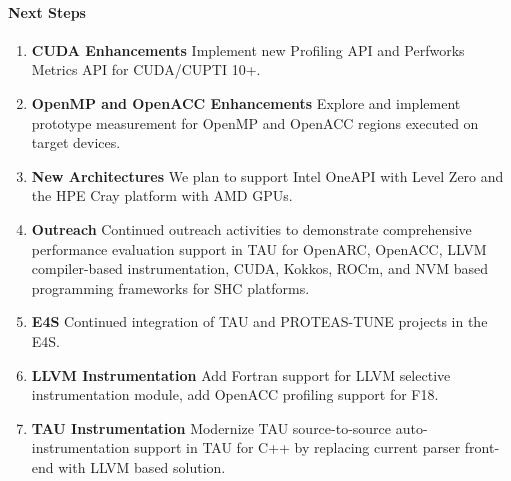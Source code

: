 \paragraph{Next Steps}
\begin{enumerate}
\item \textbf{CUDA Enhancements} 
Implement new Profiling API and Perfworks Metrics API for CUDA/CUPTI 10+.

\item \textbf{OpenMP and OpenACC Enhancements} 
Explore and implement prototype measurement for OpenMP and OpenACC regions executed on target devices.

\item \textbf{New Architectures} 
We plan to support Intel OneAPI with Level Zero and the HPE Cray platform with AMD GPUs.

\item \textbf{Outreach}
Continued outreach activities to demonstrate comprehensive performance evaluation support in TAU for OpenARC, OpenACC, LLVM compiler-based instrumentation, CUDA, Kokkos, ROCm, and NVM based programming frameworks for SHC platforms. 

\item \textbf{E4S} 
Continued integration of TAU and PROTEAS-TUNE projects in the E4S. 

\item \textbf{LLVM Instrumentation} Add Fortran support for LLVM selective instrumentation module, add OpenACC profiling support for F18.

\item \textbf{TAU Instrumentation} Modernize TAU source-to-source auto-instrumentation support in TAU for C++ by replacing current parser front-end with LLVM based solution.

\end{enumerate}
